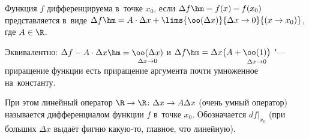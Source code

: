 
    Функция $f$ дифференцируема в~точке $x_0$, если $\Delta f\hm=f(x)-f(x_0)$ представляется в~виде $\Delta f\hm=A\cdot\Delta x+\lims{\oo(\Delta x)}{\Delta x\to 0}{(x\to x_0)}$, где $A\in \R$.

    Эквивалентно: $\Delta f-A\cdot\Delta x\hm=\underset{\Delta x\to0}{\oo(\Delta x)}$ и $\Delta f\hm=\Delta x\big(A+\underset{\Delta x\to 0}{\oo(1)\big)}$ "--- приращение функции есть приращение аргумента почти умноженное на~константу.


При этом линейный оператор $\R\to\R\colon \Delta x\to A\Delta x$ (очень умный оператор) называется дифференциалом функции $f$ в~точке $x_0$.
Обозначается $df\big|_{x_0}$ (при больших $\Delta x$ выдаёт фигню какую-то, главное, что линейную).

 